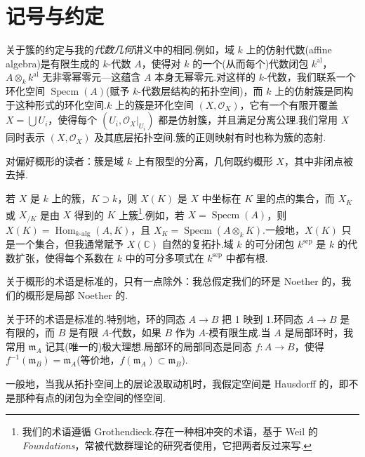
\chapter*{记号与约定}

关于簇的约定与我的\emph{代数几何}讲义中的相同.例如，域 $k$ 上的仿射代数(affine algebra)是有限生成的 $k$-代数 $A$，使得对 $k$ 的一个(从而每个)代数闭包 $k^{\mathrm{al}}$，$A \otimes_k k^{\mathrm{al}}$ 无非零幂零元---这蕴含 $A$ 本身无幂零元.对这样的 $k$-代数，我们联系一个环化空间 $\operatorname{Specm}(A)$(赋予 $k$-代数层结构的拓扑空间)，而 $k$ 上的仿射簇是同构于这种形式的环化空间.$k$ 上的簇是环化空间 $(X, \mathcal{O}_X)$，它有一个有限开覆盖 $X = \bigcup U_i$，使得每个 $(U_i, \mathcal{O}_X|_{U_i})$ 都是仿射簇，并且满足分离公理.我们常用 $X$ 同时表示 $(X, \mathcal{O}_X)$ 及其底层拓扑空间.簇的正则映射有时也称为簇的态射.

对偏好概形的读者：簇是域 $k$ 上有限型的分离，几何既约概形 $X$，其中非闭点被去掉.

若 $X$ 是 $k$ 上的簇，$K \supset k$，则 $X(K)$ 是 $X$ 中坐标在 $K$ 里的点的集合，而 $X_K$ 或 $X_{/K}$ 是由 $X$ 得到的 $K$ 上簇\footnote{我们的术语遵循 Grothendieck.存在一种相冲突的术语，基于 Weil 的 \emph{Foundations}，常被代数群理论的研究者使用，它把两者反过来写.}.例如，若 $X = \operatorname{Specm}(A)$，则 $X(K) = \operatorname{Hom}_{k\text{-alg}}(A, K)$，且 $X_K = \operatorname{Specm}(A \otimes_k K)$.一般地，$X(K)$ 只是一个集合，但我通常赋予 $X(\mathbb{C})$ 自然的复拓扑.域 $k$ 的可分闭包 $k^{\mathrm{sep}}$ 是 $k$ 的代数扩张，使得每个系数在 $k$ 中的可分多项式在 $k^{\mathrm{sep}}$ 中都有根.

关于概形的术语是标准的，只有一点除外：我总假定我们的环是 Noether 的，我们的概形是局部 Noether 的.

关于环的术语是标准的.特别地，环的同态 $A \to B$ 把 1 映到 1.环同态 $A \to B$ 是有限的，而 $B$ 是有限 $A$-代数，如果 $B$ 作为 $A$-模有限生成.当 $A$ 是局部环时，我常用 $\mathfrak{m}_A$ 记其(唯一的)极大理想.局部环的局部同态是同态 $f \colon A \to B$，使得 $f^{-1}(\mathfrak{m}_B) = \mathfrak{m}_A$(等价地，$f(\mathfrak{m}_A) \subset \mathfrak{m}_B$).

一般地，当我从拓扑空间上的层论汲取动机时，我假定空间是 Hausdorff 的，即不是那种有点的闭包为全空间的怪空间.

